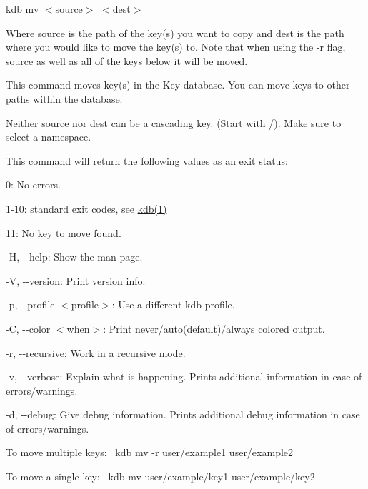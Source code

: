 {\ttfamily kdb mv $<$source$>$ $<$dest$>$}

Where {\ttfamily source} is the path of the key(s) you want to copy and {\ttfamily dest} is the path where you would like to move the key(s) to. Note that when using the {\ttfamily -\/r} flag, {\ttfamily source} as well as all of the keys below it will be moved.

This command moves key(s) in the Key database. You can move keys to other paths within the database.

Neither {\ttfamily source} nor {\ttfamily dest} can be a cascading key. (Start with {\ttfamily /}). Make sure to select a namespace.

This command will return the following values as an exit status\+:


\begin{DoxyItemize}
\item 0\+: No errors.
\item 1-\/10\+: standard exit codes, see \mbox{\hyperlink{doc_help_kdb_md}{kdb(1)}}
\item 11\+: No key to move found.
\end{DoxyItemize}


\begin{DoxyItemize}
\item {\ttfamily -\/H}, {\ttfamily -\/-\/help}\+: Show the man page.
\item {\ttfamily -\/V}, {\ttfamily -\/-\/version}\+: Print version info.
\item {\ttfamily -\/p}, {\ttfamily -\/-\/profile $<$profile$>$}\+: Use a different kdb profile.
\item {\ttfamily -\/C}, {\ttfamily -\/-\/color $<$when$>$}\+: Print never/auto(default)/always colored output.
\item {\ttfamily -\/r}, {\ttfamily -\/-\/recursive}\+: Work in a recursive mode.
\item {\ttfamily -\/v}, {\ttfamily -\/-\/verbose}\+: Explain what is happening. Prints additional information in case of errors/warnings.
\item {\ttfamily -\/d}, {\ttfamily -\/-\/debug}\+: Give debug information. Prints additional debug information in case of errors/warnings.
\end{DoxyItemize}

To move multiple keys\+:~\newline
 {\ttfamily kdb mv -\/r user/example1 user/example2}

To move a single key\+:~\newline
 {\ttfamily kdb mv user/example/key1 user/example/key2} 